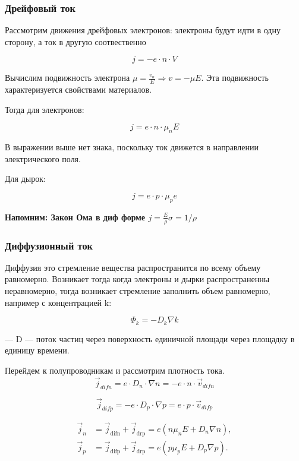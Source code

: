 \documentclass[../main.tex]{subfiles}
\begin{document}
\subsubsection{Дрейфовый ток}

Рассмотрим движения дрейфовых электронов: электроны будут идти в одну сторону, а ток в другую соотвественно

\[j = -e \cdot n \cdot V\]

Вычислим подвижность электрона $\mu = \frac{v_n}{E} \Rightarrow v = - \mu E$. Эта подвижность характеризуется свойствами материалов. 

Тогда для электронов:

\[j = e \cdot n \cdot \mu_n E\] 

В выражении выше нет знака, поскольку ток движется в направлении электрического поля.

Для дырок:

\[j = e \cdot p \cdot \mu_p e\]

\textbf{Напомним: Закон Ома в диф форме $j = \frac{E}{\rho} \sigma = 1/\rho$}

\subsubsection{Диффузионный ток}

Диффузия это стремление вещества распространится по всему объему равномерно. Возникает тогда когда электроны и дырки распространенны неравномерно,
тогда возникает стремление заполнить объем равномерно, например с концентрацией k:

\[\Phi_k = -D_k \nabla k\]
\begin{center}
    --- D --- поток частиц через поверхность единичной площади через площадку в единицу времени.    
\end{center}


Перейдем к полупроводникам и рассмотрим плотность тока.
\[\vec j_{difn} = e \cdot D_n \cdot \nabla n = -e \cdot n \cdot \vec v_{difn} \]

\[\vec j_{difp} = - e \cdot D_p \cdot \nabla p = e \cdot p \cdot \vec v_{difp}\]

\[
\boxed{
\begin{aligned}
\vec{j}_n &= \vec{j}_{\mathrm{difn}} + \vec{j}_{\mathrm{drp}} = e\!\left(n \mu_n E + D_n \nabla n\right),\\[6pt]
\vec{j}_p &= \vec{j}_{\mathrm{difp}} + \vec{j}_{\mathrm{drp}} = e\!\left(p \mu_p E + D_p \nabla p\right).
\end{aligned}
}
\]
\end{document}
